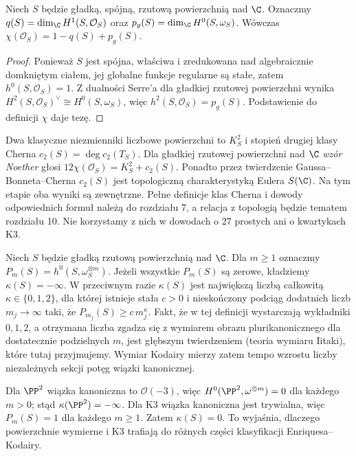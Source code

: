 \begin{stwierdzenie}
\label{st:ga6-chi}
Niech $S$ będzie gładką, spójną, rzutową powierzchnią
nad $\C$. Oznaczmy $q(S)=\dim_\C H^1(S,\mathcal O_S)$
oraz $p_g(S)=\dim_\C H^0(S,\omega_S)$.
Wówczas $\chi(\mathcal O_S)=1-q(S)+p_g(S)$.
\end{stwierdzenie}
\begin{proof}
Ponieważ $S$ jest spójna, właściwa i zredukowana
nad algebraicznie domkniętym ciałem, jej globalne
funkcje regularne są stałe, zatem
$h^0(S,\mathcal O_S)=1$. Z dualności Serre'a
dla gładkiej rzutowej powierzchni wynika
$H^2(S,\mathcal O_S)^\vee\cong H^0(S,\omega_S)$,
więc $h^2(S,\mathcal O_S)=p_g(S)$.
Podstawienie do definicji $\chi$ daje tezę.
\end{proof}

\begin{uwaga}
Dwa klasyczne niezmienniki liczbowe powierzchni
to $K_S^2$ i stopień drugiej klasy Cherna
$c_2(S)=\deg c_2(T_S)$. Dla gładkiej rzutowej
powierzchni nad $\C$ \emph{wzór Noether} głosi
$12\chi(\mathcal O_S)=K_S^2+c_2(S)$.
Ponadto przez twierdzenie Gaussa--Bonneta--Cherna
$c_2(S)$ jest topologiczną charakterystyką Eulera
$S(\C)$. Na tym etapie oba wyniki są zewnętrzne.
Pełne definicje klas Cherna i dowody odpowiednich
formuł należą do rozdziału 7, a relacja z topologią
będzie tematem rozdziału 10. Nie korzystamy z nich
w dowodach o $27$ prostych ani o kwartykach K3.
\end{uwaga}

\begin{definicja}
Niech $S$ będzie gładką rzutową powierzchnią nad $\C$.
Dla $m\ge1$ oznaczmy
$P_m(S)=h^0(S,\omega_S^{\otimes m})$.
Jeżeli wszystkie $P_m(S)$ są zerowe, kładziemy
$\kappa(S)=-\infty$. W przeciwnym razie
$\kappa(S)$ jest największą liczbą całkowitą
$\kappa\in\{0,1,2\}$, dla której istnieje stała
$c>0$ i nieskończony podciąg dodatnich liczb
$m_j\to\infty$ taki, że
$P_{m_j}(S)\ge c\,m_j^{\kappa}$.
Fakt, że w tej definicji wystarczają wykładniki
$0,1,2$, a otrzymana liczba zgadza się z wymiarem obrazu
plurikanonicznego dla dostatecznie podzielnych $m$,
jest głębszym twierdzeniem (teoria wymiaru Iitaki),
które tutaj przyjmujemy.
Wymiar Kodairy mierzy zatem tempo wzrostu
liczby niezależnych sekcji potęg wiązki kanonicznej.
\end{definicja}

\begin{przyklad}
Dla $\PP^2$ wiązka kanoniczna to $\mathcal O(-3)$,
więc $H^0(\PP^2,\omega^{\otimes m})=0$
dla każdego $m>0$; stąd $\kappa(\PP^2)=-\infty$.
Dla K3 wiązka kanoniczna jest trywialna,
więc $P_m(S)=1$ dla każdego $m\ge1$.
Zatem $\kappa(S)=0$. To wyjaśnia, dlaczego
powierzchnie wymierne i K3 trafiają do różnych
części klasyfikacji Enriquesa--Kodairy.
\end{przyklad}

